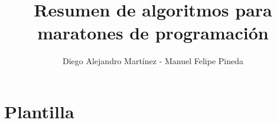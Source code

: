 \documentclass[10pt,letterpaper,twocolumn,twosided]{article}
\newcommand{\codigofuente}[1]{

\dotfill
}
\begin{document}
\title{Resumen de algoritmos para maratones de programación}
\author{Diego Alejandro Martínez - Manuel Felipe Pineda}
\maketitle

\tableofcontents
{}

\newpage 
\section{Plantilla}
\codigofuente{../src/template.ext}
\end{document}
